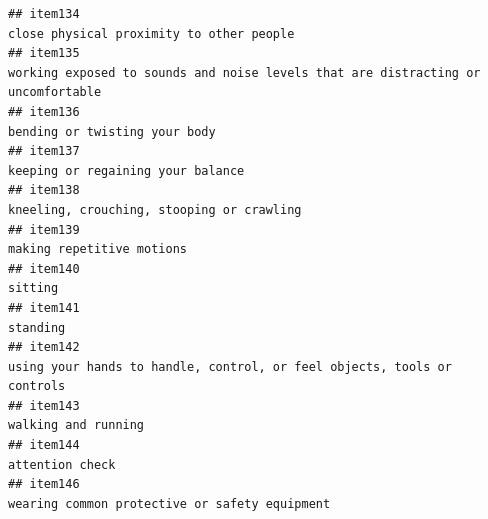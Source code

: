 \documentclass[
  man]{apa6}
\begin{document}
\begin{verbatim}
## item134                                                                                                                                                                                  close physical proximity to other people
## item135                                                                                                                                          working exposed to sounds and noise levels that are distracting or uncomfortable
## item136                                                                                                                                                                                             bending or twisting your body
## item137                                                                                                                                                                                         keeping or regaining your balance
## item138                                                                                                                                                                                 kneeling, crouching, stooping or crawling
## item139                                                                                                                                                                                                 making repetitive motions
## item140                                                                                                                                                                                                                   sitting
## item141                                                                                                                                                                                                                  standing
## item142                                                                                                                                                   using your hands to handle, control, or feel objects, tools or controls
## item143                                                                                                                                                                                                       walking and running
## item144                                                                                                                                                                                                           attention check
## item146                                                                                                                                                                            wearing common protective or safety equipment 

\end{verbatim}
\end{document}
